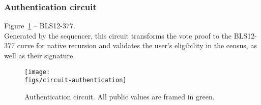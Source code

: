 \newpage
\subsubsection{Authentication circuit}

Figure~\ref{fig:circuit-authentication} -- BLS12-377.\\

\noi Generated by the sequencer, this circuit transforms the vote proof to the BLS12-377 curve for native recursion and validates the user's eligibility in the census, as well as their signature.

\begin{figure}[H]
	\centerline{\texttt{[image: \\figs/circuit-authentication]}}
	\caption{Authentication circuit. All public values are framed in green.}
	\label{fig:circuit-authentication}
\end{figure}

